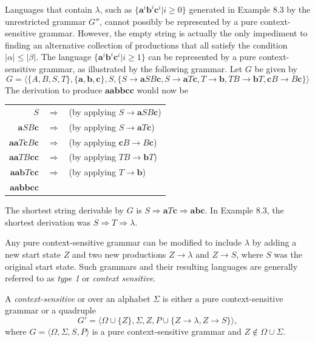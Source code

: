 Languages that contain $\lambda$, such as $\{\pmb{a}^i\pmb{b}^i\pmb{c}^i|i \geq
0\}$ generated in Example 8.3 by the unrestricted grammar $G''$, cannot possibly
be represented by a pure context-sensitive grammar. However, the empty string is
actually the only impediment to finding an alternative collection of productions
that all satisfy the condition $|\alpha| \leq |\beta|$. The language
$\{\pmb{a}^i\pmb{b}^i\pmb{c}^i|i \geq 1\}$ can be represented by a pure
context-sensitive grammar, as illustrated by the following grammar. Let $G$ be
given by
\[ G = \langle\{A,B,S,T\},\{\pmb{a},\pmb{b},\pmb{c}\},S,\{S \rightarrow
	\pmb{a}SB\pmb{c},S \rightarrow \pmb{a}T\pmb{c}, T \rightarrow \pmb{b},
	TB \rightarrow \pmb{b}T, \pmb{c}B \rightarrow B\pmb{c}\}\rangle \]
The derivation to produce $\pmb{aabbcc}$ would now be
\begin{center}\begin{tabular}{r@{ }c@{ }l@{ }}
$S$ & $\Rightarrow$ & (by applying $S \rightarrow \pmb{a}SB\pmb{c}$) \\
$\pmb{a}SB\pmb{c}$ & $\Rightarrow$ & (by applying $S \rightarrow \pmb{a}T\pmb{c}$) \\
$\pmb{aa}T\pmb{c}B\pmb{c}$ & $\Rightarrow$ & (by applying $\pmb{c}B \rightarrow
	B\pmb{c}$) \\
$\pmb{aa}TB\pmb{cc}$ & $\Rightarrow$ & (by applying $TB \rightarrow \pmb{b}T$) \\
$\pmb{aab}T\pmb{cc}$ & $\Rightarrow$ & (by applying $T \rightarrow \pmb{b}$) \\
$\pmb{aabbcc}$
\end{tabular}\end{center}
The shortest string derivable by $G$ is $S \Rightarrow \pmb{a}T\pmb{c}
\Rightarrow \pmb{abc}$. In Example 8.3, the shortest derivation was $S
\Rightarrow T \Rightarrow \lambda$.

Any pure context-sensitive grammar can be modified to include $\lambda$ by
adding a new start state $Z$ and two new productions $Z \rightarrow \lambda$ and
$Z \rightarrow S$, where $S$ was the original start state. Such grammars and
their resulting languages are generally referred to as \emph{type 1} or
\emph{context sensitive}.

\begin{dfn}\label{dfn-8.4}
A \emph{context-sensitive} or \emph{} over an
alphabet $\Sigma$ is either a pure context-sensitive grammar or a quadruple
\[ G'=\langle\Omega\cup\{Z\},\Sigma,Z,P\cup\{Z\rightarrow\lambda,Z\rightarrow
	S\}\rangle, \]
where $G=\langle\Omega,\Sigma,S,P\rangle$ is a pure context-sensitive grammar
and $Z \not \in \Omega\cup\Sigma$.
\end{dfn}

